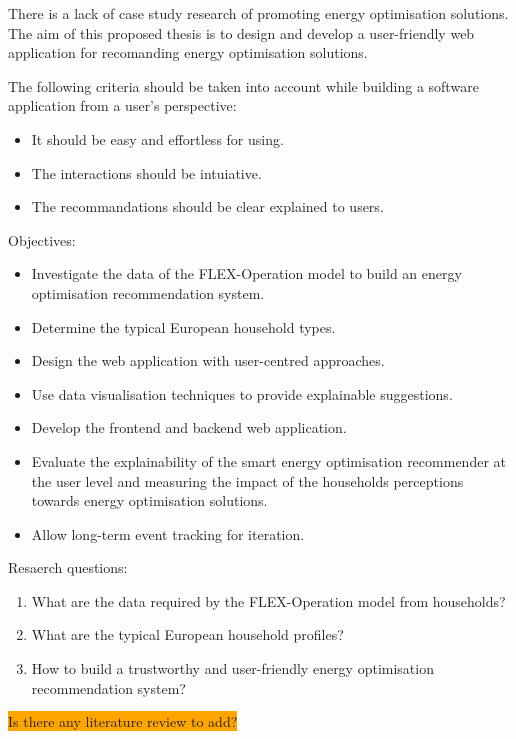 There is a lack of case study research of promoting energy optimisation solutions. 
The aim of this proposed thesis is to design and develop a user-friendly web application for recomanding energy optimisation solutions.

The following criteria should be taken into account while building a software application from a user's perspective: 

\begin{itemize}
  \item It should be easy and effortless for using. 
  \item The interactions should be intuiative. 
  \item The recommandations should be clear explained to users. 
\end{itemize}

Objectives: 

\begin{itemize}
  \item Investigate the data of the FLEX-Operation model to build an energy optimisation recommendation system. 
  \item Determine the typical European household types. 
  \item Design the web application with user-centred approaches. 
  \item Use data visualisation techniques to provide explainable suggestions. 
  \item Develop the frontend and backend web application. 
  \item Evaluate the explainability of the smart energy optimisation recommender at the user level and measuring the impact of the households perceptions towards energy optimisation solutions. 
  \item Allow long-term event tracking for iteration. 
\end{itemize}

Resaerch questions:

\begin{enumerate}
  \item What are the data required by the FLEX-Operation model from households? 
  \item What are the typical European household profiles? 
  \item How to build a trustworthy and user-friendly energy optimisation recommendation system? 
\end{enumerate}

\colorbox{orange}{Is there any literature review to add?}




